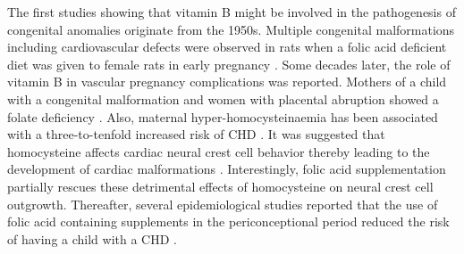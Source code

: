 \begin{refsection}
The first studies showing that vitamin B might be involved in the pathogenesis of congenital anomalies originate from the 1950s. Multiple congenital malformations including cardiovascular defects were observed in rats when a folic acid deficient diet was given to female rats in early pregnancy \cite{nelson1952production,baird1954congenital}. Some decades later, the role of vitamin B in vascular pregnancy complications was reported. Mothers of a child with a congenital malformation and women with placental abruption showed a folate deficiency \cite{hibbard1965folic,smithells1976vitamin}. Also, maternal hyper-homocysteinaemia has been associated with a three-to-tenfold increased risk of CHD \cite{kirby1983neural,bartelings1985contribution,shaw1995maternal}. It was suggested that homocysteine affects cardiac neural crest cell behavior thereby leading to the development of cardiac malformations \cite{boot2003folic}. Interestingly, folic acid supplementation partially rescues these detrimental effects of homocysteine on neural crest cell outgrowth. Thereafter, several epidemiological studies reported that the use of folic acid containing supplements in the periconceptional period reduced the risk of having a child with a CHD \cite{botto1996periconceptional,czeizel1998periconceptional,botto2000occurrence}.


\end{refsection}
